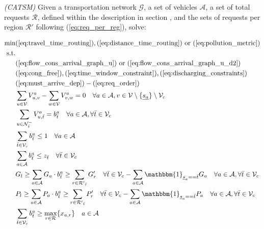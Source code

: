 \begin{algori}{\textit{(CATSM)}}
	Given a transportation network $\mathcal{G}$, a set of vehicles $\mathcal{A}$, a set of total requests $\mathcal{R}$, defined within the description in section ,  and the sets of requests per region $\mathcal{R}'$ following (\ref{eq:req_per_reg}), solve: \\
\end{algori}
\begin{align}
	\text{min}&  
		(\ref{eq:travel_time_routing}), (\ref{eq:distance_time_routing}) \text{ or } (\ref{eq:pollution_metric})
	\nonumber\\
	\text{s.t.} &\nonumber\\
	&(\ref{eq:flow_cons_arrival_graph_u}) \text{ or } (\ref{eq:flow_cons_arrival_graph_u_d2})\nonumber\\%
	&(\ref{eq:cong_free}),(\ref{eq:time_window_constraint}),(\ref{eq:discharging_constraints})\nonumber\\
	&(\ref{eq:must_arrive_dep})-(\ref{eq:req_order})\nonumber\\
	&\sum_{u \in \mathcal{V}} V^a_{u, v} - \sum_{w \in \mathcal{V}} V^a_{v, w} = 0 \quad \forall a \in \mathcal{A}, v \in \mathcal{V} \setminus \{\underline{s_a}\}\setminus\mathcal{V}_c  \label{eq:flow_conservation_graph_u2} \\	
	&\sum_{ u \in \mathcal{N}^-_{\bar{t}} }V^a_{u, \bar{t}} = b_{\bar{t}}^a \quad \forall a \in \mathcal{A},\forall \bar{t} \in \mathcal{V}_c  \label{eq:each_vehicle_end2}\\
	 &\sum_{\bar{t}\in \mathcal{V}_c} b_{\bar{t}}^a \leq 1\quad \forall a \in \mathcal{A}
	 \label{eq:one_depot_vehicle}\\
	&\sum_{a \in \mathcal{A}}b_{\bar{t}}^a  \leq z_{\bar{t}} \quad \forall \bar{t} \in \mathcal{V}_c \label{eq:capacity_depot_respected2}\\
	&G_{l}\ge\sum_{a \in \mathcal{A}} G_a \cdot b_{\bar{t}}^a \ge \sum_{r \in \mathcal{R'}_{\bar{t}}} G'_r \quad \forall \bar{t} \in \mathcal{V}_c - \sum_{a \in \mathcal{A}} \mathbbm{1}_{\underline{s}_a == \bar{t}}G_a  \quad \forall a \in \mathcal{A},\forall \bar{t} \in \mathcal{V}_c\label{eq:goods_cap2}\\
	&P_{l}\ge\sum_{a \in \mathcal{A}}P_a \cdot b_{\bar{t}}^a\ge \sum_{r \in \mathcal{R'}_{\bar{t}}} P'_r \quad \forall \bar{t} \in \mathcal{V}_c - \sum_{a \in \mathcal{A}} \mathbbm{1}_{\underline{s}_a == \bar{t}}P_a \quad \forall a \in \mathcal{A},\forall \bar{t} \in \mathcal{V}_c	\label{eq:people_cap2}\\
	&\sum_{\bar{t} \in \mathcal{V}_c}b_{\bar{t}}^a   \ge \underset{ r \in \mathcal{R}}{\max}\{x_{a,r}\}  \quad a \in \mathcal{A} \label{eq:rebalancing_moving}
\end{align}
